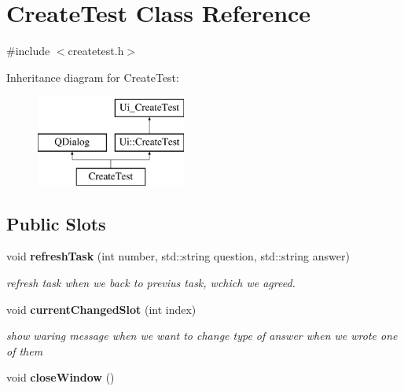 \section{Create\-Test Class Reference}
\label{class_create_test}


{\ttfamily \#include $<$createtest.\-h$>$}

Inheritance diagram for Create\-Test\-:\begin{figure}[H]
\begin{center}
\leavevmode
\includegraphics[height=3.000000cm]{class_create_test}
\end{center}
\end{figure}
\subsection*{Public Slots}
\begin{DoxyCompactItemize}
\item 
void {\bf refresh\-Task} (int number, std\-::string question, std\-::string answer)
\begin{DoxyCompactList}\small\item\em refresh task when we back to previus task, wchich we agreed. \end{DoxyCompactList}\item 
void {\bf current\-Changed\-Slot} (int index)
\begin{DoxyCompactList}\small\item\em show waring message when we want to change type of answer when we wrote one of them \end{DoxyCompactList}\item 
void {\bf close\-Window} ()
\end{DoxyCompactItemize}
